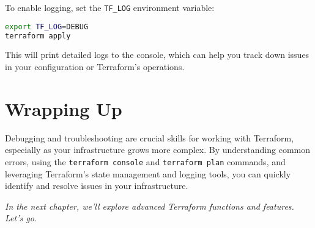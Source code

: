 To enable logging, set the \texttt{TF\_LOG} environment variable:

\begin{lstlisting}[language=bash]
export TF_LOG=DEBUG
terraform apply
\end{lstlisting}

This will print detailed logs to the console, which can help you track down issues in your configuration or Terraform's operations.

\section{Wrapping Up}

Debugging and troubleshooting are crucial skills for working with Terraform, especially as your infrastructure grows more complex. By understanding common errors, using the \texttt{terraform console} and \texttt{terraform plan} commands, and leveraging Terraform's state management and logging tools, you can quickly identify and resolve issues in your infrastructure.

\vspace{1em}

\textit{In the next chapter, we'll explore advanced Terraform functions and features. Let's go.}

